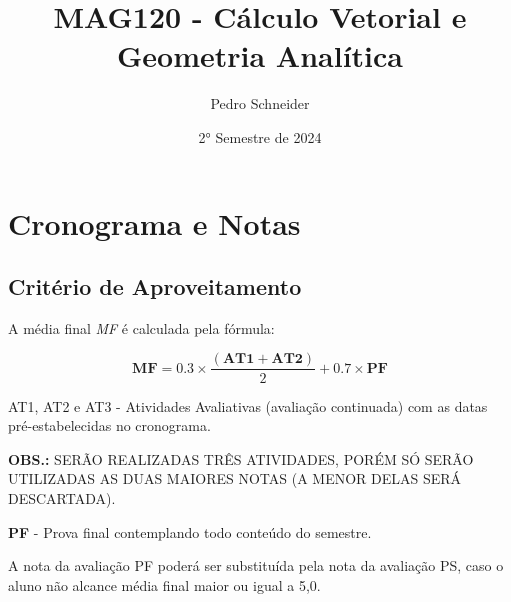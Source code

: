 \documentclass[12pt]{article}
\title{MAG120 - Cálculo Vetorial e Geometria Analítica}
\author{Pedro Schneider}
\date{2° Semestre de 2024}
\begin{document}
\maketitle

\section{Cronograma e Notas}

\subsection{Critério de Aproveitamento}
A média final \textit{MF} é calculada pela fórmula:

\begin{center}
    \[
    \bm{MF} = 0.3 \times \frac{(\bm{AT1} + \bm{AT2})}{2} + 0.7 \times \bm{PF}
    \]
\end{center}

\noindent
AT1, AT2 e AT3 - Atividades Avaliativas (avaliação continuada) com as datas pré-estabelecidas no cronograma.

\noindent
\textbf{OBS.:} SERÃO REALIZADAS TRÊS ATIVIDADES, PORÉM SÓ SERÃO UTILIZADAS AS DUAS MAIORES NOTAS (A MENOR DELAS SERÁ DESCARTADA).

\noindent
\break \textbf{PF} - Prova final contemplando todo conteúdo do semestre.

\noindent
A nota da avaliação PF poderá ser substituída pela nota da avaliação PS, caso o aluno não alcance média final maior ou igual a 5,0.

\renewcommand{\arraystretch}{1.25} %
\end{document}
